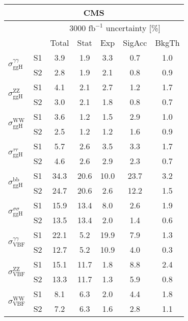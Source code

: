 \begin{tabular}{@{} l c c@{\hskip 0.15in} c c c c @{}}
 \hline
 \multicolumn{7}{c}{CMS}\\
 \hline
  &  & \multicolumn{5}{c}{3000 $\text{fb}^{-1}$ uncertainty [\%]} \\
  &  & Total & Stat & Exp & SigAcc & BkgTh \\
 \hline
\multirow{2}{*}{$\sigma_{\mathrm{ggH}}^{\gamma \gamma }$} & S1  & 3.9& 1.9 & 3.3 & 0.7 & 1.0  \\[1pt]
                        & S2  & 2.8& 1.9 & 2.1 & 0.8 & 0.9  \\[4pt]
\multirow{2}{*}{$\sigma_{\mathrm{ggH}}^{\mathrm{ZZ}}$} & S1  & 4.1& 2.1 & 2.7 & 1.2 & 1.7  \\[1pt]
                        & S2  & 3.0& 2.1 & 1.8 & 0.8 & 0.7  \\[4pt]
\multirow{2}{*}{$\sigma_{\mathrm{ggH}}^{\mathrm{WW}}$} & S1  & 3.6& 1.2 & 1.5 & 2.9 & 1.0  \\[1pt]
                        & S2  & 2.5& 1.2 & 1.2 & 1.6 & 0.9  \\[4pt]
\multirow{2}{*}{$\sigma_{\mathrm{ggH}}^{\tau \tau }$} & S1  & 5.7& 2.6 & 3.5 & 3.3 & 1.7  \\[1pt]
                        & S2  & 4.6& 2.6 & 2.9 & 2.3 & 0.7  \\[4pt]
\multirow{2}{*}{$\sigma_{\mathrm{ggH}}^{\mathrm{bb}}$} & S1  & 34.3& 20.6 & 10.0 & 23.7 & 3.2  \\[1pt]
                        & S2  & 24.7& 20.6 & 2.6 & 12.2 & 1.5  \\[4pt]
\multirow{2}{*}{$\sigma_{\mathrm{ggH}}^{\sigma \sigma }$} & S1  & 15.9& 13.4 & 8.0 & 2.6 & 1.9  \\[1pt]
                        & S2  & 13.5& 13.4 & 2.0 & 1.4 & 0.6  \\[4pt]
\multirow{2}{*}{$\sigma_{\mathrm{VBF}}^{\gamma \gamma }$} & S1  & 22.1& 5.2 & 19.9 & 7.9 & 1.3  \\[1pt]
                        & S2  & 12.7& 5.2 & 10.9 & 4.0 & 0.3  \\[4pt]
\multirow{2}{*}{$\sigma_{\mathrm{VBF}}^{\mathrm{ZZ}}$} & S1  & 15.1& 11.7 & 1.8 & 8.8 & 2.4  \\[1pt]
                        & S2  & 13.3& 11.7 & 1.3 & 5.9 & 0.8  \\[4pt]
\multirow{2}{*}{$\sigma_{\mathrm{VBF}}^{\mathrm{WW}}$} & S1  & 8.1& 6.3 & 2.0 & 4.4 & 1.8  \\[1pt]
                        & S2  & 7.2& 6.3 & 1.6 & 2.8 & 1.1  \\[4pt]

\end{tabular}
